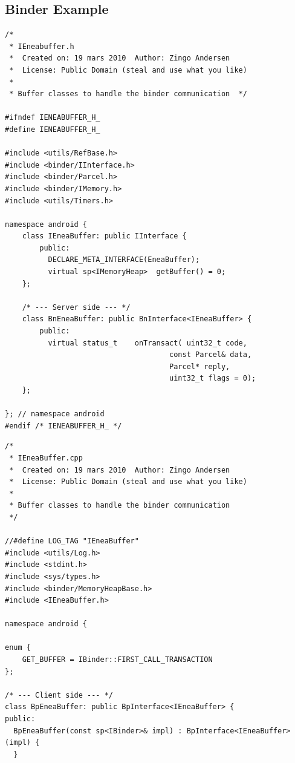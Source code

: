 \documentclass[a4paper,11pt]{article}
\begin{document}
\appendix
{}
\begin{appendices} 
    \section{Binder Example} \label{eneabuffer}
\begin{lstlisting}[caption=Interface header: IEneaBuffer.h,label={IEneaBufferHeader}]
/*
 * IEneabuffer.h
 *  Created on: 19 mars 2010  Author: Zingo Andersen
 *  License: Public Domain (steal and use what you like)
 *
 * Buffer classes to handle the binder communication  */

#ifndef IENEABUFFER_H_
#define IENEABUFFER_H_

#include <utils/RefBase.h>
#include <binder/IInterface.h>
#include <binder/Parcel.h>
#include <binder/IMemory.h>
#include <utils/Timers.h>

namespace android { 
    class IEneaBuffer: public IInterface {
        public:
          DECLARE_META_INTERFACE(EneaBuffer);
          virtual sp<IMemoryHeap>  getBuffer() = 0;
    };

    /* --- Server side --- */ 
    class BnEneaBuffer: public BnInterface<IEneaBuffer> {
        public:
          virtual status_t    onTransact( uint32_t code,
                                      const Parcel& data,
                                      Parcel* reply,
                                      uint32_t flags = 0);
    };

}; // namespace android 
#endif /* IENEABUFFER_H_ */    
\end{lstlisting}

\begin{lstlisting}[caption=Interface class: IEneaBuffer.cpp, label=IEneaBufferCPP]
/*
 * IEneaBuffer.cpp
 *  Created on: 19 mars 2010  Author: Zingo Andersen
 *  License: Public Domain (steal and use what you like)
 *
 * Buffer classes to handle the binder communication
 */

//#define LOG_TAG "IEneaBuffer"
#include <utils/Log.h>
#include <stdint.h>
#include <sys/types.h>
#include <binder/MemoryHeapBase.h>
#include <IEneaBuffer.h>

namespace android {

enum {
    GET_BUFFER = IBinder::FIRST_CALL_TRANSACTION
};

/* --- Client side --- */
class BpEneaBuffer: public BpInterface<IEneaBuffer> {
public:
  BpEneaBuffer(const sp<IBinder>& impl) : BpInterface<IEneaBuffer>(impl) {
  }


\end{lstlisting}
\end{appendices}
\end{document}
